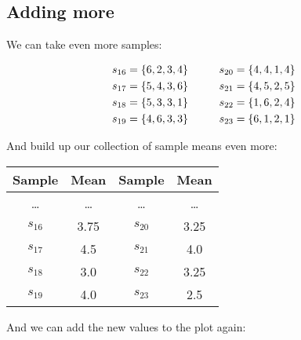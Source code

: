 \documentclass[../../../main.tex]{subfiles}
\begin{document}
\subsection{Adding more}

We can take even more samples:

\begin{align*}
  s_{16} = \{ 6, 2, 3, 4 \} \hskip 1cm s_{20} = \{ 4, 4, 1, 4 \} \\
  s_{17} = \{ 5, 4, 3, 6 \} \hskip 1cm s_{21} = \{ 4, 5, 2, 5 \} \\
  s_{18} = \{ 5, 3, 3, 1 \} \hskip 1cm s_{22} = \{ 1, 6, 2, 4 \} \\
  s_{19} = \{ 4, 6, 3, 3 \} \hskip 1cm s_{23} = \{ 6, 1, 2, 1 \} 
\end{align*}

\noindent
And build up our collection of sample means even more:

\begin{center}
  \begin{tabular}{| c | c || c | c |}
    \hline
    \textbf{Sample} & \textbf{Mean} & \textbf{Sample} & \textbf{Mean} \\ \hline
    \ldots & \ldots & \ldots & \ldots \\ \hline
    $s_{16}$ & 3.75 & $s_{20}$ & 3.25 \\ \hline
    $s_{17}$ & 4.5 & $s_{21}$ & 4.0 \\ \hline
    $s_{18}$ & 3.0 & $s_{22}$ & 3.25 \\ \hline
    $s_{19}$ & 4.0 & $s_{23}$ & 2.5 \\ \hline
  \end{tabular}
\end{center}

\noindent
And we can add the new values to the plot again: 

\begin{center}
\end{center}
\end{document}
